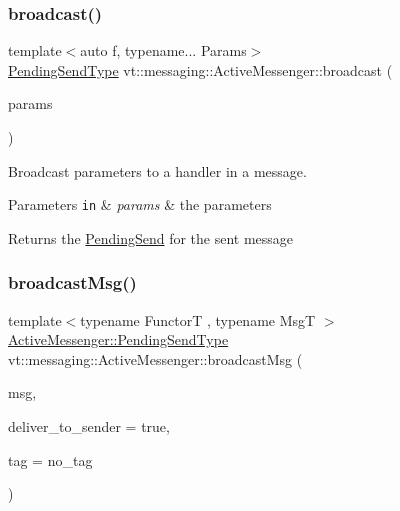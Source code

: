 \subsubsection{\texorpdfstring{broadcast()}{broadcast()}}
{\footnotesize\ttfamily template$<$auto f, typename... Params$>$ \\
\hyperlink{structvt_1_1messaging_1_1_active_messenger_a3626a6ca76d8ad4ec7c3b47a2c70d3a8}{Pending\+Send\+Type} vt\+::messaging\+::\+Active\+Messenger\+::broadcast (\begin{DoxyParamCaption}\item[{Params \&\&...}]{params }\end{DoxyParamCaption})\hspace{0.3cm}{\ttfamily [inline]}}



Broadcast parameters to a handler in a message. 


\begin{DoxyParams}[1]{Parameters}
\mbox{\tt in}  & {\em params} & the parameters\\
\hline
\end{DoxyParams}
\begin{DoxyReturn}{Returns}
the {\ttfamily \hyperlink{structvt_1_1messaging_1_1_pending_send}{Pending\+Send}} for the sent message 
\end{DoxyReturn}
\mbox{\label{group__typesafehan_ga1a347aac6b6b8d47c9b1c8cc11b7f33e}} 
\subsubsection{\texorpdfstring{broadcast\+Msg()}{broadcastMsg()}\hspace{0.1cm}{\footnotesize\ttfamily [1/2]}}
{\footnotesize\ttfamily template$<$typename FunctorT , typename MsgT $>$ \\
\hyperlink{structvt_1_1messaging_1_1_active_messenger_a3626a6ca76d8ad4ec7c3b47a2c70d3a8}{Active\+Messenger\+::\+Pending\+Send\+Type} vt\+::messaging\+::\+Active\+Messenger\+::broadcast\+Msg (\begin{DoxyParamCaption}\item[{\hyperlink{structvt_1_1messaging_1_1_msg_ptr_thief}{Msg\+Ptr\+Thief}$<$ MsgT $>$}]{msg,  }\item[{bool}]{deliver\+\_\+to\+\_\+sender = {\ttfamily true},  }\item[{\hyperlink{namespacevt_a84ab281dae04a52a4b243d6bf62d0e52}{Tag\+Type}}]{tag = {\ttfamily no\+\_\+tag} }\end{DoxyParamCaption})}



